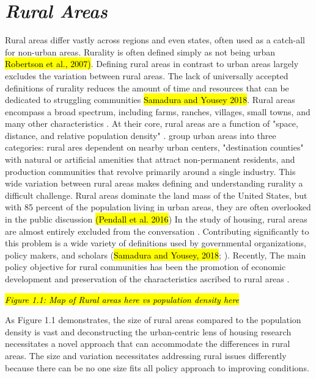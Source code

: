 \section{\textit{Rural Areas}}
Rural areas differ vastly across regions and even states, often used as a catch-all for non-urban areas. Rurality is often defined simply as not being urban \hl{Robertson et al., 2007)}. Defining rural areas in contrast to urban areas largely excludes the variation between rural areas. The lack of universally accepted definitions of rurality reduces the amount of time and resources that can be dedicated to struggling communities \hl{Samadura and Yousey 2018}. Rural areas encompass a broad spectrum, including farms, ranches, villages, small towns, and many other characteristics \citep{cromartie_defining_2008}. At their core, rural areas are a function of "space, distance, and relative population density" \citep[?]{castle_place_2011}.\citet{shoup_principles_2010} group urban areas into three categories: rural ares dependent on nearby urban centers, "destination counties" with natural or artificial amenities that attract non-permanent residents, and production communities that revolve primarily around a single industry. This wide variation between rural areas makes defining and understanding rurality a difficult challenge. Rural areas dominate the land mass of the United States, but with 85 percent of the population living in urban areas, they are often overlooked in the public discussion \hl{(Pendall et al. 2016}) In the study of housing, rural areas are almost entirely excluded from the conversation \citep{gkartzios_housing_2017}. Contributing significantly to this problem is a wide variety of definitions used by governmental organizations, policy makers, and scholars (\hl{Samadura and Yousey, 2018}; \citealp{cromartie_defining_2008}). Recently, The main policy objective for rural communities has been the promotion of economic development and preservation of the characteristics ascribed to rural areas \citep{lichter_changing_2007}. 

\textit{\hl{Figure 1.1: Map of Rural areas here vs population density here}} %

As Figure 1.1 demonstrates, the size of rural areas compared to the population density is vast and deconstructing the urban-centric lens of housing research necessitates a novel approach that can accommodate the differences in rural areas. The size and variation necessitates addressing rural issues differently because there can be no one size fits all policy approach to improving conditions. 

